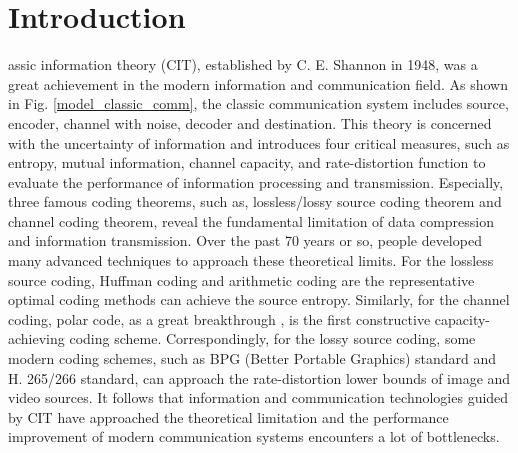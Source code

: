 \documentclass[12pt, draftclsnofoot,onecolumn]{IEEEtran}
\begin{document}
\IEEEpeerreviewmaketitle

\section{Introduction}
\label{section_I}

assic information theory (CIT), established by C. E. Shannon \cite{Classicpaper_Shannon} in 1948, was a great achievement in the modern information and communication field. As shown in Fig. \ref{model_classic_comm}, the classic communication system includes source, encoder, channel with noise, decoder and destination. This theory is concerned with the uncertainty of information and introduces four critical measures, such as entropy, mutual information, channel capacity, and rate-distortion function to evaluate the performance of information processing and transmission. Especially, three famous coding theorems, such as, lossless/lossy source coding theorem and channel coding theorem, reveal the fundamental limitation of data compression and information transmission. Over the past 70 years or so, people developed many advanced techniques to approach these theoretical limits. For the lossless source coding, Huffman coding and arithmetic coding are the representative optimal coding methods can achieve the source entropy. Similarly, for the channel coding, polar code, as a great breakthrough \cite{Polarcode_Arikan}, is the first constructive capacity-achieving coding scheme. Correspondingly, for the lossy source coding, some modern coding schemes, such as BPG (Better Portable Graphics) standard and H. 265/266 standard, can approach the rate-distortion lower bounds of image and video sources. It follows that information and communication technologies guided by CIT have approached the theoretical limitation and the performance improvement of modern communication systems encounters a lot of bottlenecks.
\end{document}
